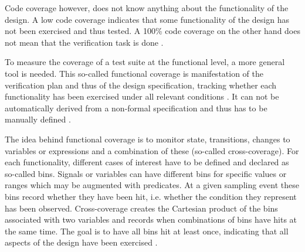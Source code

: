 Code coverage however, does not know anything about the functionality of the design. A low code coverage indicates that
some functionality of the design has not been exercised and thus tested. A 100\% code coverage on the other hand does
not mean that the verification task is done \cite[Ch. 2]{bergeron2012writing}.

To measure the coverage of a test suite at the functional level, a more general tool is needed. This so-called
functional coverage is manifestation of the verification plan and thus of the design specification, tracking whether
each functionality has been exercised under all relevant conditions \cite[Sec. 7.6]{flake2020a}. It can not be
automatically derived from a non-formal specification and thus has to be manually defined \cite[Ch. 15]{mehta2021introduction}.

The idea behind functional coverage is to monitor state, transitions, changes to variables or expressions and a
combination of these (so-called cross-coverage). For each functionality, different cases of interest have to be
defined and declared as so-called bins. Signals or variables can have different bins for specific values or ranges
which may be augmented with predicates. At a given sampling event these bins record whether they have been hit, i.e.
whether the condition they represent has been observed. Cross-coverage creates the Cartesian product of the bins
associated with two variables and records when combinations of bins have hits at the same time. The goal is to have
all bins hit at least once, indicating
that all aspects of the design have been exercised \cite[Sec. 7.6]{flake2020a}.

